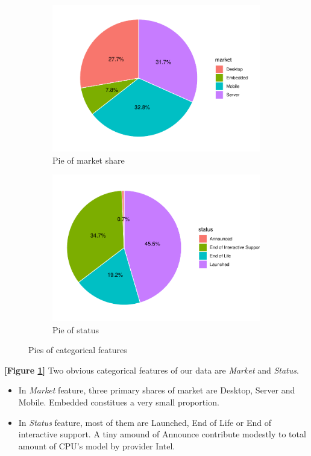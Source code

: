 \begin{figure}[H]
    \centering
    \begin{subfigure}[b]{0.49\textwidth}
        \centering
        \includegraphics[width=\textwidth]{./graphics/pie_market.pdf}
        \caption{Pie of market share}
    \end{subfigure}
    \hfill
    \begin{subfigure}[b]{0.49\textwidth}
        \centering
        \includegraphics[width=\textwidth]{./graphics/pie_status.pdf}
        \caption{Pie of status}
    \end{subfigure}
    \caption{Pies of categorical features}
    \label{fig:pie_category}
\end{figure}

\textbf{[Figure \ref{fig:pie_category}]} Two obvious categorical features of our data are \textit{Market} and \textit{Status}.
\begin{itemize}
    \item In \textit{Market} feature, three primary shares of market are Desktop, Server and Mobile. Embedded constitues a very small
    proportion.
    \item In \textit{Status} feature, most of them are Launched, End of Life or End of interactive support. A tiny amound of Announce
    contribute modestly to total amount of CPU's model by provider Intel.
\end{itemize}

